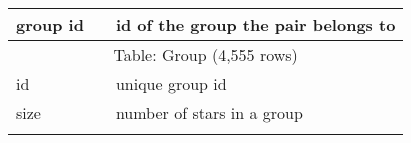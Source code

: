 \begin{table}[htb]
\begin{tabular}{l|l|l}
group id                              &        & id of the group the pair belongs to \\
\hline
\multicolumn{3}{c}{Table: Group (4,555 rows)}                                         \\
\hline
id                                    &        & unique group id                     \\
size                                  &        & number of stars in a group          \\
                                      &        &                                     \\
\hline\hline
\end{tabular}
\end{table}